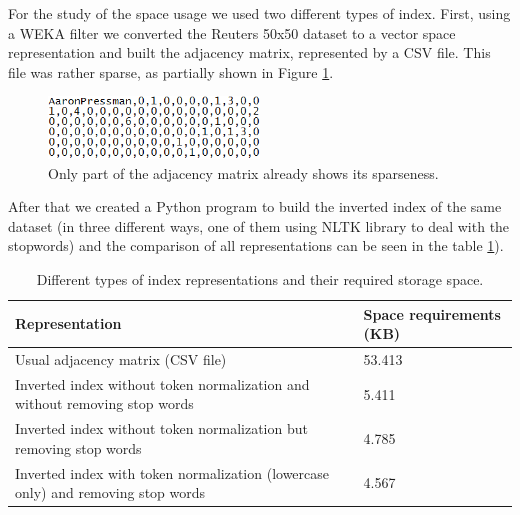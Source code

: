 For the study of the space usage we used two different types of index. First, using a WEKA filter we converted the Reuters 50x50 dataset \cite{reuters50x50} to a vector space representation and built the adjacency matrix, represented by a CSV file. This file was rather sparse, as partially shown in Figure \ref{adjacency_matrix}.
\begin{figure}[h!]
 \centering
   \includegraphics[width=0.5\textwidth]{images/adjacency_matrix.png}
 \caption{\label{adjacency_matrix}Only part of the adjacency matrix already shows its sparseness.}
\end{figure}

After that we created a Python program to build the inverted index of the same dataset (in three different ways, one of them using NLTK library to deal with the stopwords) and the comparison of all representations can be seen in the table \ref{space_comparison}).

\begin{table}[ht]
	\centering
	\caption{\label{space_comparison}Different types of index representations and their required storage space.}
    \begin{tabular}{| p{7cm} | p{3cm} |}
    	\hline
		Representation & Space requirements (KB) \\ \hline
		Usual adjacency matrix (CSV file) & 53.413 \\ \hline
		Inverted index without token normalization and without removing stop words & 5.411 \\ \hline
		Inverted index without token normalization but removing stop words & 4.785 \\ \hline
		Inverted index with token normalization (lowercase only) and removing stop words & 4.567 \\ \hline
    \end{tabular}
\end{table}

